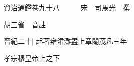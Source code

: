 






























































資治通鑑卷九十八　　　宋　司馬光　撰

胡三省　音註

晉紀二十|{
	起著雍涒灘盡上章閹茂凡三年}


孝宗穆皇帝上之下

